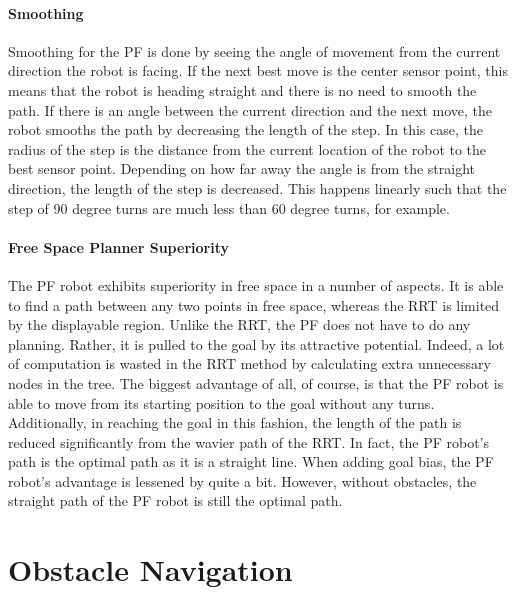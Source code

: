 \documentclass[12pt]{article}
\begin{document}
\paragraph*{Smoothing}
Smoothing for the PF is done by seeing the angle of movement from the current direction the robot is facing. If the next best move is the center sensor point, this means that the robot is heading straight and there is no need to smooth the path. If there is an angle between the current direction and the next move, the robot smooths the path by decreasing the length of the step. In this case, the radius of the step is the distance from the current location of the robot to the best sensor point. Depending on how far away the angle is from the straight direction, the length of the step is decreased. This happens linearly such that the step of 90 degree turns are much less than 60 degree turns, for example.

\paragraph*{Free Space Planner Superiority}
The PF robot exhibits superiority in free space in a number of aspects. It is able to find a path between any two points in free space, whereas the RRT is limited by the displayable region. Unlike the RRT, the PF does not have to do any planning. Rather, it is pulled to the goal by its attractive potential. Indeed, a lot of computation is wasted in the RRT method by calculating extra unnecessary nodes in the tree. The biggest advantage of all, of course, is that the PF robot is able to move from its starting position to the goal without any turns. Additionally, in reaching the goal in this fashion, the length of the path is reduced significantly from the wavier path of the RRT. In fact, the PF robot's path is the optimal path as it is a straight line. When adding goal bias, the PF robot's advantage is lessened by quite a bit. However, without obstacles, the straight path of the PF robot is still the optimal path.

\section{Obstacle Navigation}
\end{document}
